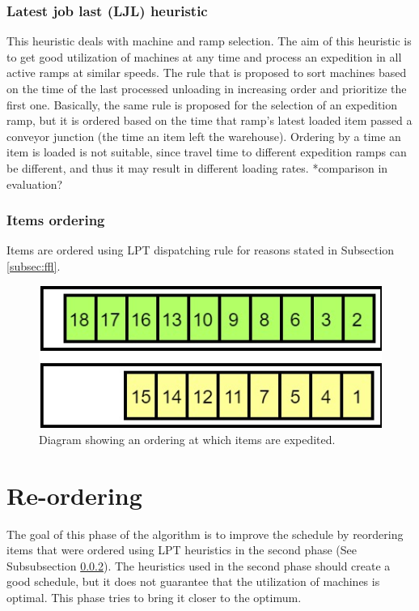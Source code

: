 \documentclass{ctuthesis}
\begin{document}
\subsubsection{Latest job last (LJL) heuristic }
This heuristic deals with machine and ramp selection.
The aim of this heuristic is to get good utilization of machines at any time and process an expedition in all active ramps at similar speeds. The rule that is proposed to sort machines based on the time of the last processed unloading in increasing order and prioritize the first one. 
Basically, the same rule is proposed for the selection of an expedition ramp, but it is ordered based on the time that ramp's latest loaded item passed a conveyor junction (the time an item left the warehouse). Ordering by a time an item is loaded is not suitable, since travel time to different expedition ramps can be different, and thus it may result in different loading rates. *comparison in evaluation?

\subsubsection{Items ordering}
\label{subsubsec:itemsordering}

Items are ordered using LPT dispatching rule for reasons stated in Subsection \ref{subsec:ffl}.


\begin{figure}[h]
\includegraphics[width=1\linewidth]{order.jpg}
\caption{Diagram showing an ordering at which items are expedited.}
\label{order}
\end{figure}

\section{Re-ordering}

The goal of this phase of the algorithm is to improve the schedule by reordering items that were ordered using LPT heuristics in the second phase (See Subsubsection \ref{subsubsec:itemsordering}). The heuristics used in the second phase should create a good schedule, but it does not guarantee that the utilization of machines is optimal. This phase tries to bring it closer to the optimum.
\end{document}

